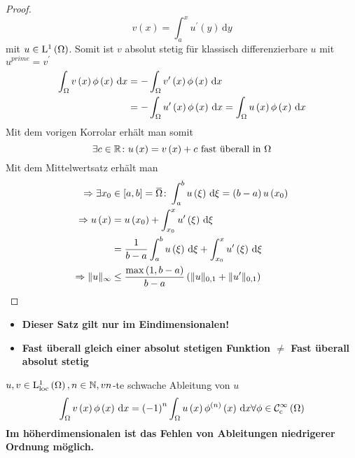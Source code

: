\begin{proof}
	\begin{equation*}
		v\left(x\right) = \int_{a}^{x}u^{\prime}\left(y\right)\,\mathrm{d}y
	\end{equation*}
	mit $u\in\mathrm{L}^{1}\left(\Omega\right)$. Somit ist $v$ absolut stetig für klassisch differenzierbare $u$ mit $u^{prime}=v^{\prime}$
	\begin{align*}
		\int_{\Omega}v\left(x\right)\phi\left(x\right)\,\mathrm{d}x &= -\int_{\Omega}v^{\prime}\left(x\right)\phi\left(x\right)\,\mathrm{d}x \\
			&= -\int_{\Omega}u^{\prime}\left(x\right)\phi\left(x\right)\,\mathrm{d}x = \int_{\Omega}u\left(x\right)\phi\left(x\right)\,\mathrm{d}x
	\end{align*}
	Mit dem vorigen Korrolar erhält man somit
	\begin{equation*}
		\exists c\in\mathbb{R} \colon u\left(x\right) = v\left(x\right) + c \text{ fast überall in } \Omega
	\end{equation*}
	Mit dem Mittelwertsatz erhält man 
	\begin{align*}
		\implies \exists x_{0}&\in\left[a,b\right] = \overbar{\W} \colon \int_{a}^{b}u\left(\xi\right)\,\mathrm{d}\xi = \left(b-a\right)u\left(x_{0}\right)\\
		\implies u\left(x\right) &= u\left(x_{0}\right) + \int_{x_{0}}^{x}u^{\prime}\left(\xi\right)\d\xi\\
			&= \frac{1}{b-a}\int_{a}^{b}u\left(\xi\right)\d\xi + \int_{x_{0}}^{x}u^{\prime}\left(\xi\right)\d\xi\\
		\implies \|u\|_{\infty} &\leq \frac{\operatorname{max}\left(1,b-a\right)}{b-a}\left(\|u\|_{0,1}+\|u^{\prime}\|_{0,1}\right)
	\end{align*}
\end{proof}

\begin{itemize}
	\item \textbf{Dieser Satz gilt nur im Eindimensionalen!}\\
	\item \textbf{Fast überall gleich einer absolut stetigen Funktion $\neq$ Fast überall absolut stetig}
\end{itemize}

\begin{definition}
	$u,v\in\mathrm{L}^{1}_{\text{loc}}\left(\Omega\right), n\in\mathbb{N}, v n$-te schwache Ableitung von $u$
	\begin{equation*}
		\int_{\Omega} v\left(x\right)\phi\left(x\right)\,\mathrm{d} x = \left(-1\right)^{n} \int_{\Omega} u\left(x\right)\phi^{\left(n\right)}\left(x\right)\,\mathrm{d} x \forall \phi\in\mathcal{C}^{\infty}_{\text{c}}\left(\Omega\right)
	\end{equation*}
	\textbf{Im höherdimensionalen ist das Fehlen von Ableitungen niedrigerer Ordnung möglich.}
\end{definition}

